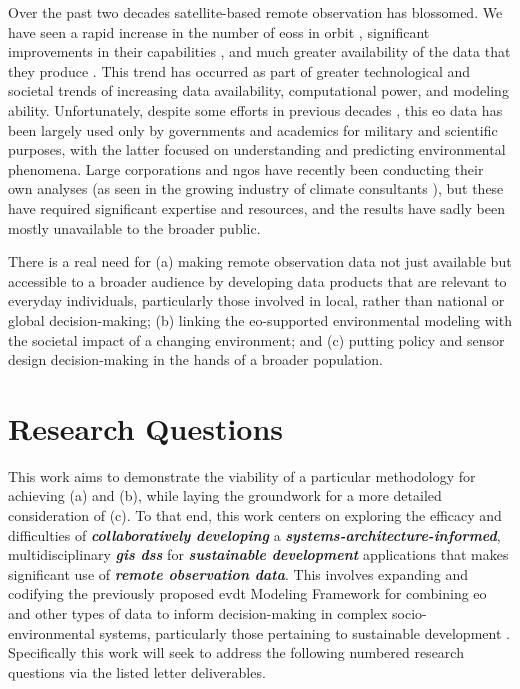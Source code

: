 \documentclass[notitlepage]{article}
\begin{document}
Over the past two decades satellite-based remote observation has blossomed. We have seen a rapid increase in the number of \acp{eos} in orbit \cite{belwardWhoLaunchedWhat2015}, significant improvements in their capabilities \cite{jensenRemoteSensingEnvironment2006}, and much greater availability of the data that they produce \cite{borowitzOpenSpaceGlobal2017}. This trend has occurred as part of greater technological and societal trends of increasing data availability, computational power, and modeling ability. Unfortunately, despite some efforts in previous decades \cite{lightWarfareWelfareDefense2005}, this \ac{eo} data has been largely used only by governments and academics for military and scientific purposes, with the latter focused on understanding and predicting environmental phenomena. Large corporations and \acp{ngo} have recently been conducting their own analyses (as seen in the growing industry of climate consultants \cite{cohenTop10Climate2011}), but these have required significant expertise and resources, and the results have sadly been mostly unavailable to the broader public. 

There is a real need for (a) making remote observation data not just available but accessible to a broader audience by developing data products that are relevant to everyday individuals, particularly those involved in local, rather than national or global decision-making; (b) linking the \ac{eo}-supported environmental modeling with the societal impact of a changing environment; and (c) putting policy and sensor design decision-making in the hands of a broader population. 

\section{Research Questions} \label{sec:questions}

This work aims to demonstrate the viability of a particular methodology for achieving (a) and (b), while laying the groundwork for a more detailed consideration of (c). To that end, this work centers on exploring the efficacy and difficulties of \textbf{\textit{collaboratively developing}} a \textbf{\textit{systems-architecture-informed}}, multidisciplinary \textbf{\textit{\ac{gis} \ac{dss}}} for \textbf{\textit{sustainable development}} applications that makes significant use of \textbf{\textit{remote observation data}}. This involves expanding and codifying the previously proposed \ac{evdt} Modeling Framework  for combining \ac{eo} and other types of data to inform decision-making in complex socio-environmental systems, particularly those pertaining to sustainable development \cite{reidCombiningSocialEnvironmental2019}. Specifically this work will seek to address the following numbered research questions via the listed letter deliverables.
\end{document}
